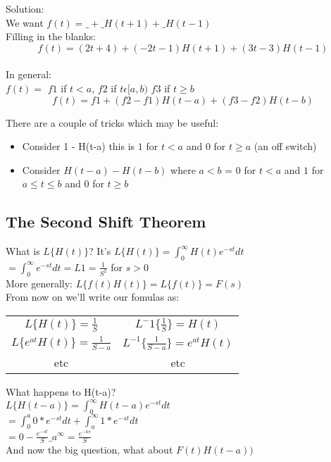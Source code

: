 \documentclass[12pt]{article}
\begin{document}
	Solution:\\
	We want $f(t) = \_ + \_H(t+1) + \_H(t-1)$\\
	Filling in the blanks:\\
	$$f(t) = (2t + 4) + (-2t - 1)H(t+1) + (3t - 3)H(t-1)$$\\
	
	In general:\\
	$f(t) = $ $f1$ if $t < a$, $f2$ if $t \epsilon [a,b)$ $f3$ if $t \ge b$\\
	$$f(t) = f1 + (f2 - f1)H(t-a) + (f3-f2)H(t-b)$$
	
	There are a couple of tricks which may be useful:\\
	\begin{itemize}
		\item Consider 1 - H(t-a) this is $1$ for $t < a$ and $0$ for $t \ge a$ (an off switch)
		\item Consider $H(t-a) - H(t-b)$ where $a < b$ = $0$ for $t < a$ and $1$ for $a \le t \le b$ and $0$ for $t \ge b$
	\end{itemize}
	
	\subsection*{The Second Shift Theorem}
	What is $L\{H(t)\}$? It's $L\{H(t)\} = \int_0^{\infty}H(t)e^{-st}dt$\\
	$= \int_0^{\infty}e^{-st}dt = L{1} = \frac{1}{S^2}$ for $s > 0$\\
	
	More generally: $L\{f(t)H(t)\} = L\{f(t)\} = F(s)$\\
	From now on we'll write our fomulas as:\\
	
	\begin{tabular}{c | c}
		$L\{H(t)\} = \frac{1}{S}$ & $L^-1\{\frac{1}{S}\} = H(t)$\\
		$L\{e^{at}H(t)\} = \frac{1}{S-a}$ & $L^{-1}\{\frac{1}{S-a} \} = e^{at}H(t)$\\
		etc & etc 
	\end{tabular}
	
	What happens to H(t-a)?\\
	$L\{H(t-a)\} = \int_0^{\infty}H(t-a)e^{-st}dt$\\
	$ = \int_0^a 0 * e^{-st}dt + \int_a^{\infty} 1 * e^{-st}dt$\\
	$ = 0 - \frac{e^{-st}}{S} \_a^{\infty} = \frac{e^{-as}}{S}$\\
	And now the big question, what about $F(t)H(t-a))$\\
	
\end{document}

